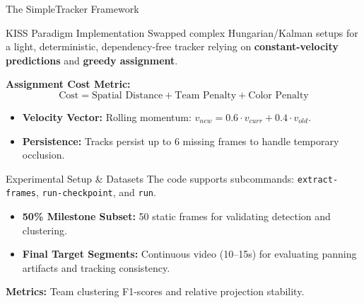 \documentclass[10pt]{beamer}
\begin{document}
\begin{frame}{The SimpleTracker Framework}
    \begin{block}{KISS Paradigm Implementation}
        Swapped complex Hungarian/Kalman setups for a light, deterministic, dependency-free tracker relying on \textbf{constant-velocity predictions} and \textbf{greedy assignment}.
    \end{block}
    \vspace{0.2cm}
    \textbf{Assignment Cost Metric:}
    \[ \text{Cost} = \text{Spatial Distance} + \text{Team Penalty} + \text{Color Penalty} \]
    \begin{itemize}
        \item \textbf{Velocity Vector:} Rolling momentum: $v_{new} = 0.6 \cdot v_{curr} + 0.4 \cdot v_{old}$.
        \item \textbf{Persistence:} Tracks persist up to $6$ missing frames to handle temporary occlusion.
    \end{itemize}
\end{frame}

\begin{frame}{Experimental Setup \& Datasets}
    The code supports subcommands: \texttt{extract-frames}, \texttt{run-checkpoint}, and \texttt{run}.
    \vspace{0.3cm}
    \begin{itemize}
        \item \textbf{50\% Milestone Subset:} 50 static frames for validating detection and clustering.
        \item \textbf{Final Target Segments:} Continuous video (10--15s) for evaluating panning artifacts and tracking consistency.
    \end{itemize}
    \vspace{0.2cm}
    \textbf{Metrics:} Team clustering F1-scores and relative projection stability.
\end{frame}
\end{document}

